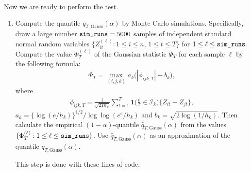 \documentclass[a4paper]{article}
\begin{document}
Now we are ready to perform the test.
\begin{enumerate}[label=\textit{Step \arabic*.}, leftmargin=1.45cm]
  \item Compute the quantile $q_{T,\text{Gauss}}(\alpha)$ by Monte Carlo simulations. Specifically, draw a large number $\verb|sim_runs| = 5000$ samples of independent standard normal random variables $\{Z_{it}^{(\ell)} : 1 \le i \le n, \, 1 \le t \le T \}$ for $1 \le \ell \le \verb|sim_runs|$. Compute the value $\Phi_T^{(\ell)}$ of the Gaussian statistic $\Phi_T$ for each sample $\ell$ by the following formula:
\begin{align*}
\Phi_T = \max_{(i,j,k)} a_k \big( |\phi_{ijk,T}| - b_k \big),
\end{align*}
where
\begin{align*}
\phi_{ijk,T} = \frac{1}{\sqrt{2Th_k}} \sum\limits_{t=1}^T \mathbf{1}\Big(\frac{t}{T} \in \mathcal{I}_k\Big) \big\{ Z_{it} - Z_{jt} \big\},
\end{align*}
$a_k = \{\log(e/h_k)\}^{1/2} / \log \log(e^e / h_k)$ and $b_k = \sqrt{2 \log(1/h_k)}$. Then calculate the empirical $(1-\alpha)$-quantile $\hat{q}_{T,\text{Gauss}}(\alpha)$ from the values $\{ \Phi_T^{(\ell)}: 1 \le \ell \le \verb|sim_runs| \}$. Use $\hat{q}_{T,\text{Gauss}}(\alpha)$ as an approximation of the quantile $q_{T,\text{Gauss}}(\alpha)$.

This step is done with these lines of code:


\end{enumerate}
\end{document}
